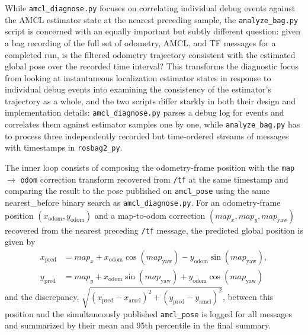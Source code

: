 While \texttt{amcl\_diagnose.py} focuses on correlating individual debug events against the AMCL estimator state at the nearest preceding sample, the \texttt{analyze\_bag.py} script is concerned with an equally important but subtly different question: given a bag recording of the full set of odometry, AMCL, and TF messages for a completed run, is the filtered odometry trajectory consistent with the estimated global pose over the recorded time interval? This transforms the diagnostic focus from looking at instantaneous localization estimator states in response to individual debug events into examining the consistency of the estimator's trajectory as a whole, and the two scripts differ starkly in both their design and implementation details: \texttt{amcl\_diagnose.py} parses a debug log for events and correlates them against estimator samples one by one, while \texttt{analyze\_bag.py} has to process three independently recorded but time-ordered streams of messages with timestamps in \texttt{rosbag2\_py}.

The inner loop consists of composing the odometry-frame position with the \texttt{map} $\rightarrow$ \texttt{odom} correction transform recovered from \texttt{/tf} at the same timestamp and comparing the result to the pose published on \texttt{amcl\_pose} using the same nearest\_before binary search as \texttt{amcl\_diagnose.py}. For an odometry-frame position $(x_{\text{odom}}, y_{\text{odom}})$ and a map-to-odom correction $(map_x, map_y, map_{\text{yaw}})$ recovered from the nearest preceding \texttt{/tf} message, the predicted global position is given by
\begin{equation}
\begin{aligned}
x_{\text{pred}} &= map_x + x_{\text{odom}} \cos(map_{\text{yaw}}) - y_{\text{odom}} \sin(map_{\text{yaw}}), \\
y_{\text{pred}} &= map_y + x_{\text{odom}} \sin(map_{\text{yaw}}) + y_{\text{odom}} \cos(map_{\text{yaw}})
\end{aligned}
\label{eq:predicted_global_position}
\end{equation}
and the discrepancy, $\sqrt{(x_{\text{pred}} - x_{\text{amcl}})^2 + (y_{\text{pred}} - y_{\text{amcl}})^2}$, between this position and the simultaneously published \texttt{amcl\_pose} is logged for all messages and summarized by their mean and 95th percentile in the final summary.

